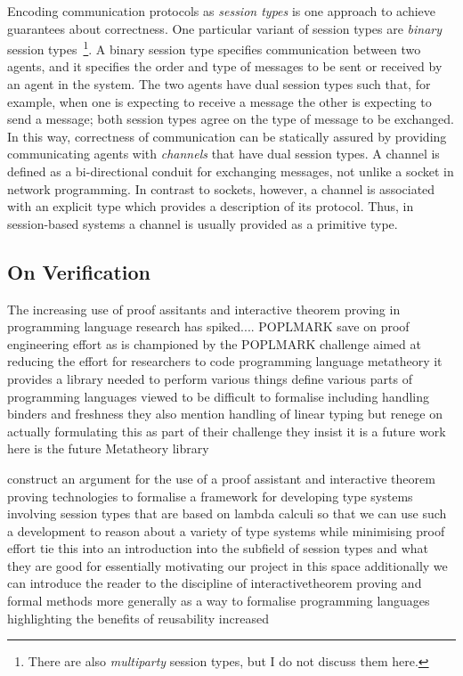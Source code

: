 \documentclass{mprop}
\begin{document}
Encoding communication protocols as \textit{session types} is one approach to achieve guarantees about correctness. One particular variant of session types are \textit{binary} session types~\footnote{There are also \textit{multiparty} session types, but I do not discuss them here.}. A binary session type specifies communication between two agents, and it specifies the order and type of messages to be sent or received by an agent in the system. The two agents have dual session types such that, for example, when one is expecting to receive a message the other is expecting to send a message; both session types agree on the type of message to be exchanged. In this way, correctness of communication can be statically assured by providing communicating agents with \textit{channels} that have dual session types. A channel is defined as a bi-directional conduit for exchanging messages, not unlike a socket in network programming. In contrast to sockets, however, a channel is associated with an explicit type which provides a description of its protocol. Thus, in session-based systems a channel is usually provided as a primitive type.

\subsection{On Verification}

The increasing use of proof assitants and interactive theorem proving in programming language research has spiked....
POPLMARK
save on proof engineering effort as is championed by the POPLMARK challenge aimed at reducing the effort for researchers to code programming language metatheory it provides a library needed to perform various things define various parts of programming languages viewed to be difficult to formalise including handling binders and freshness they also mention handling of linear typing but renege on actually formulating this as part of their challenge they insist it is a future work here is the future
Metatheory library

construct an argument for the use of a proof assistant and interactive theorem proving technologies to formalise a framework for developing type systems involving session types that are based on lambda calculi so that we can use such a development to reason about a variety of type systems while minimising proof effort tie this into an introduction into the subfield of session types and what they are good for essentially motivating our project in this space additionally we can introduce the reader to the discipline of interactivetheorem proving and formal methods more generally as a way to formalise programming languages highlighting the benefits of reusability increased
\end{document}
